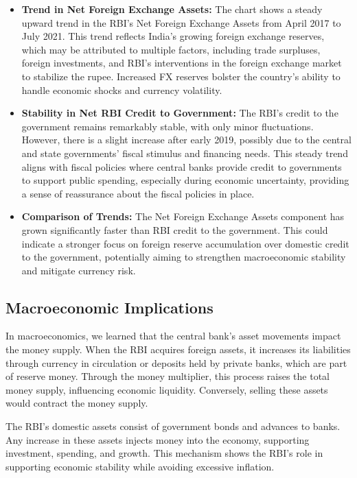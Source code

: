 \documentclass[a4paper,12pt]{extarticle} %
\begin{document}
\begin{itemize}
    \item \textbf{Trend in Net Foreign Exchange Assets:} The chart shows a steady upward trend in the RBI's Net Foreign Exchange Assets from April 2017 to July 2021. This trend reflects India's growing foreign exchange reserves, which may be attributed to multiple factors, including trade surpluses, foreign investments, and RBI's interventions in the foreign exchange market to stabilize the rupee. Increased FX reserves bolster the country’s ability to handle economic shocks and currency volatility.
    \item \textbf{Stability in Net RBI Credit to Government:} The RBI’s credit to the government remains remarkably stable, with only minor fluctuations. However, there is a slight increase after early 2019, possibly due to the central and state governments' fiscal stimulus and financing needs. This steady trend aligns with fiscal policies where central banks provide credit to governments to support public spending, especially during economic uncertainty, providing a sense of reassurance about the fiscal policies in place.
    \item \textbf{Comparison of Trends:} The Net Foreign Exchange Assets component has grown significantly faster than RBI credit to the government. This could indicate a stronger focus on foreign reserve accumulation over domestic credit to the government, potentially aiming to strengthen macroeconomic stability and mitigate currency risk.
\end{itemize}

\subsection{Macroeconomic Implications}
In macroeconomics, we learned that the central bank’s asset movements impact the money supply. When the RBI acquires foreign assets, it increases its liabilities through currency in circulation or deposits held by private banks, which are part of reserve money. Through the money multiplier, this process raises the total money supply, influencing economic liquidity. Conversely, selling these assets would contract the money supply.

The RBI's domestic assets consist of government bonds and advances to banks. Any increase in these assets injects money into the economy, supporting investment, spending, and growth. This mechanism shows the RBI’s role in supporting economic stability while avoiding excessive inflation.
\end{document}
